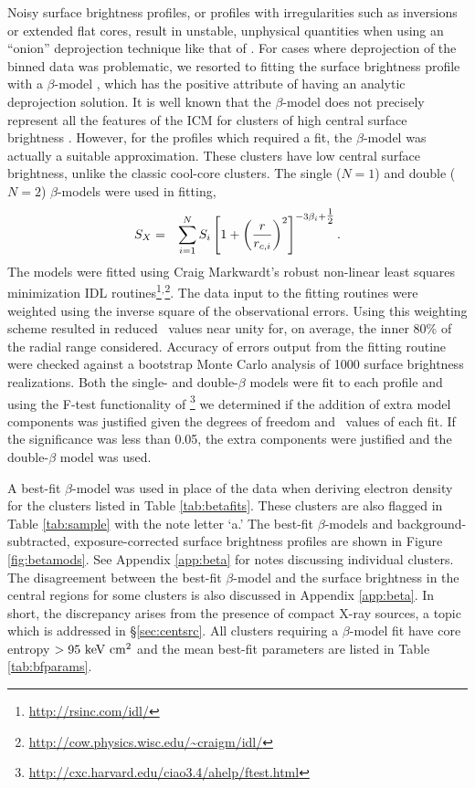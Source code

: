 \documentclass[12pt,preprint]{aastex}
\begin{document}
Noisy surface brightness profiles, or profiles with irregularities
such as inversions or extended flat cores, result in unstable,
unphysical quantities when using an ``onion'' deprojection technique
like that of \citet{kriss83}. For cases where deprojection of the
binned data was problematic, we resorted to fitting the surface
brightness profile with a $\beta$-model \citep{1978A&A....70..677C},
which has the positive attribute of having an analytic deprojection
solution. It is well known that the $\beta$-model does not precisely
represent all the features of the ICM for clusters of high central
surface brightness \citep{2000MNRAS.311..313E, 2002ApJ...579..571L,
  2007ApJ...665..911H}. However, for the profiles which required a
fit, the $\beta$-model was actually a suitable approximation. These
clusters have low central surface brightness, unlike the classic
cool-core clusters. The single ($N=1$) and double ($N=2$)
$\beta$-models were used in fitting,
\begin{eqnarray}
S_X &=& \displaystyle\sum_{i=1}^N S_i
\left[1+\left(\frac{r}{r_{c,i}}\right)^2\right]^{-3\beta_i+\mbox{$\frac{1}{2}$}}.
\end{eqnarray}
The models were fitted using Craig Markwardt's robust non-linear least
squares minimization IDL
routines\footnote{\url{http://rsinc.com/idl/}}$^{,}$\footnote{\url{http://cow.physics.wisc.edu/~craigm/idl/}}. The
data input to the fitting routines were weighted using the inverse
square of the observational errors. Using this weighting scheme
resulted in reduced \chisq\ values near unity for, on average, the
inner 80\% of the radial range considered. Accuracy of errors output
from the fitting routine were checked against a bootstrap Monte Carlo
analysis of 1000 surface brightness realizations. Both the single- and
double-$\beta$ models were fit to each profile and using the F-test
functionality of
\sherpa\footnote{\url{http://cxc.harvard.edu/ciao3.4/ahelp/ftest.html}}
we determined if the addition of extra model components was justified
given the degrees of freedom and \chisq\ values of each fit. If the
significance was less than 0.05, the extra components were justified
and the double-$\beta$ model was used.

A best-fit $\beta$-model was used in place of the data when deriving
electron density for the clusters listed in Table
\ref{tab:betafits}. These clusters are also flagged in Table
\ref{tab:sample} with the note letter `a.' The best-fit $\beta$-models
and background-subtracted, exposure-corrected surface brightness
profiles are shown in Figure \ref{fig:betamods}. See Appendix
\ref{app:beta} for notes discussing individual clusters. The
disagreement between the best-fit $\beta$-model and the surface
brightness in the central regions for some clusters is also discussed
in Appendix \ref{app:beta}. In short, the discrepancy arises from the
presence of compact X-ray sources, a topic which is addressed in
\S\ref{sec:centsrc}. All clusters requiring a $\beta$-model fit have
core entropy $> 95 \mathrm{\mbox{\ensuremath{\mathrm{~keV}}} \mathrm{\mbox{\ensuremath{\mathrm{~cm}}}^2}}$ and the mean best-fit parameters are listed
in Table \ref{tab:bfparams}.
\end{document}
